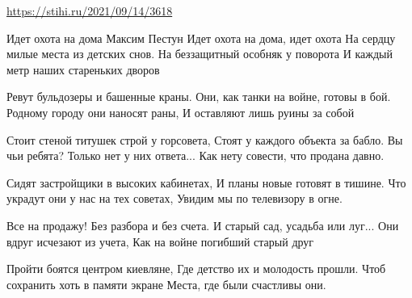  
 
 
 
 

\url{https://stihi.ru/2021/09/14/3618}

Идет охота на дома
Максим Пестун
Идет охота на дома, идет охота
На сердцу милые места из детских снов.
На беззащитный особняк у поворота
И каждый метр наших стареньких дворов

Ревут бульдозеры и башенные краны.
Они, как танки на войне, готовы в бой.
Родному городу они наносят раны,
И оставляют лишь руины за собой

Стоит стеной титушек строй у горсовета,
Стоят у каждого объекта за бабло.
Вы чьи ребята? Только нет у них ответа...
Как нету совести, что продана давно.

Сидят застройщики в высоких кабинетах,
И планы новые готовят в тишине.
Что украдут они у нас на тех советах,
Увидим мы по телевизору в огне.

Все на продажу! Без разбора и без счета.
И старый сад, усадьба или луг...
Они вдруг исчезают из учета,
Как на войне погибший старый друг

Пройти боятся центром киевляне,
Где детство их и молодость прошли.
Чтоб сохранить хоть в памяти экране
Места, где были счастливы они.
